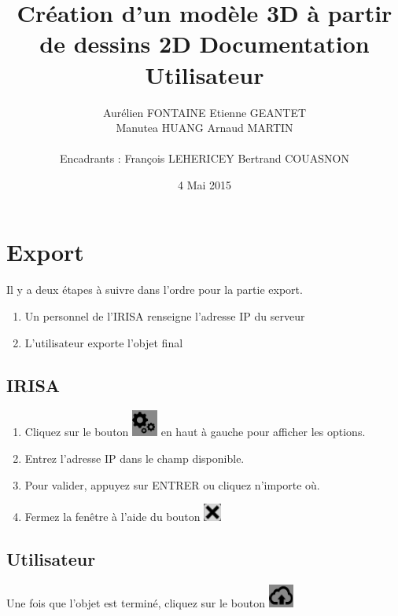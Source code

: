 \documentclass[a4paper,11pt]{article}
\title{ \textbf{Création d'un modèle 3D à partir de dessins 2D Documentation Utilisateur} }
\author{ Aurélien \textsc{FONTAINE} Etienne \textsc{GEANTET} \\
	Manutea \textsc{HUANG} Arnaud \textsc{MARTIN} \\
	\\
	Encadrants : François \textsc{LEHERICEY}	Bertrand \textsc{COUASNON}}
\date{4 Mai 2015}                    %
\begin{document}
\maketitle                 %
\thispagestyle{empty}      %

\tableofcontents

\section{Export}
	Il y a deux étapes à suivre dans l'ordre pour la partie export.
	\begin{enumerate}
		\item Un personnel de l'IRISA renseigne l'adresse IP du serveur
		\item L'utilisateur exporte l'objet final
	\end{enumerate}
	\subsection{IRISA}
		\begin{enumerate}
		\item Cliquez sur le bouton \includegraphics[scale=0.7]{./images/engrenage.png} en haut à gauche pour afficher les options.
		
		\item Entrez l'adresse IP dans le champ disponible.
		
		\item Pour valider, appuyez sur ENTRER ou cliquez n'importe où.
		
		\item Fermez la fenêtre à l'aide du bouton \includegraphics{./images/closewindow.png}
		\end{enumerate}
	\subsection{Utilisateur}
			Une fois que l'objet est terminé, cliquez sur le bouton \includegraphics[scale=0.8]{./images/export.png}
		
\end{document}

